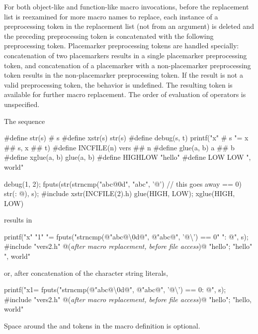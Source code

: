 \pnum
For both object-like and function-like macro invocations, before the
replacement list is reexamined for more macro names to replace,
each instance of a
\tcode{\#\#}
preprocessing token in the replacement list
(not from an argument) is deleted and the
preceding preprocessing token is concatenated
with the following preprocessing token.
Placemarker preprocessing tokens are handled specially: concatenation
of two placemarkers results in a single placemarker preprocessing token, and
concatenation of a placemarker with a non-placemarker preprocessing token results
in the non-placemarker preprocessing token.
If the result is not a valid preprocessing token,
the behavior is undefined.
The resulting token is available for further macro replacement.
The order of evaluation of
\tcode{\#\#}
operators is unspecified.

\pnum
\begin{example}
The sequence
\begin{codeblock}
#define str(s)      # s
#define xstr(s)     str(s)
#define debug(s, t) printf("x" # s "= %
               x ## s, x ## t)
#define INCFILE(n)  vers ## n
#define glue(a, b)  a ## b
#define xglue(a, b) glue(a, b)
#define HIGHLOW     "hello"
#define LOW         LOW ", world"

debug(1, 2);
fputs(str(strncmp("abc@\textbackslash@0d", "abc", '@')        // this goes away
    == 0) str(: @\atsign\textbackslash@n), s);
#include xstr(INCFILE(2).h)
glue(HIGH, LOW);
xglue(HIGH, LOW)
\end{codeblock}
results in
\begin{codeblock}
printf("x" "1" "= %
fputs("strncmp(@\textbackslash@"abc@\textbackslash\textbackslash@0d@\textbackslash@", @\textbackslash@"abc@\textbackslash@", '@\textbackslash{}') == 0" ": @\atsign\textbackslash@n", s);
#include "vers2.h"      @\textrm{(\textit{after macro replacement, before file access})}@
"hello";
"hello" ", world"
\end{codeblock}
or, after concatenation of the character string literals,
\begin{codeblock}
printf("x1= %
fputs("strncmp(@\textbackslash@"abc@\textbackslash\textbackslash@0d@\textbackslash@", @\textbackslash@"abc@\textbackslash@", '@\textbackslash{}') == 0: @\atsign\textbackslash@n", s);
#include "vers2.h"      @\textrm{(\textit{after macro replacement, before file access})}@
"hello";
"hello, world"
\end{codeblock}

Space around the \tcode{\#} and \tcode{\#\#} tokens in the macro definition
is optional.
\end{example}

